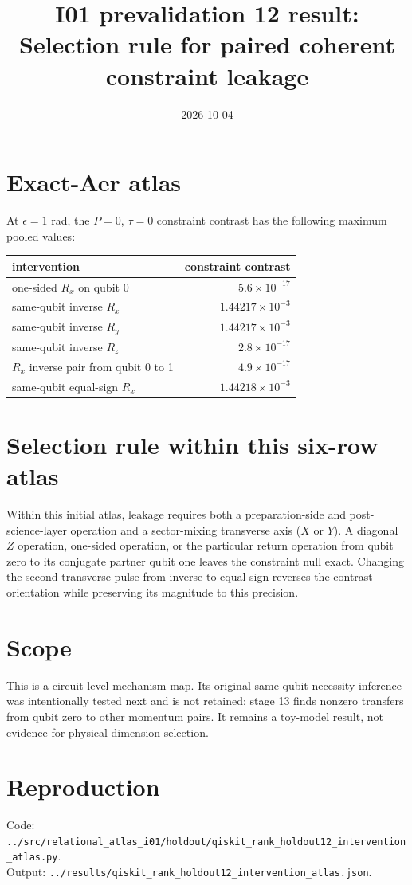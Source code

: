 \documentclass[11pt]{article}
\begin{document}
\title{I01 prevalidation 12 result:\\Selection rule for paired coherent constraint leakage}
\date{2026-10-04}
\maketitle

\section*{Exact-Aer atlas}
At $\epsilon=1$ rad, the $P=0$, $\tau=0$ constraint contrast has the following
maximum pooled values:
\begin{center}
\begin{tabular}{lr}
\toprule
intervention & constraint contrast\\
\midrule
one-sided $R_x$ on qubit 0 & $5.6\times10^{-17}$\\
same-qubit inverse $R_x$ & $1.44217\times10^{-3}$\\
same-qubit inverse $R_y$ & $1.44217\times10^{-3}$\\
same-qubit inverse $R_z$ & $2.8\times10^{-17}$\\
$R_x$ inverse pair from qubit 0 to 1 & $4.9\times10^{-17}$\\
same-qubit equal-sign $R_x$ & $1.44218\times10^{-3}$\\
\bottomrule
\end{tabular}
\end{center}

\section*{Selection rule within this six-row atlas}
Within this initial atlas, leakage requires both a preparation-side and
post-science-layer operation and a sector-mixing transverse axis ($X$ or $Y$).
A diagonal $Z$ operation, one-sided operation, or the particular return operation
from qubit zero to its conjugate partner qubit one leaves the constraint null exact.
Changing the second transverse pulse from inverse to equal sign reverses the
contrast orientation while preserving its magnitude to this precision.

\section*{Scope}
This is a circuit-level mechanism map. Its original same-qubit necessity inference
was intentionally tested next and is not retained: stage 13 finds nonzero transfers
from qubit zero to other momentum pairs. It remains a toy-model result, not evidence
for physical dimension selection.

\section*{Reproduction}
Code: \texttt{../src/relational\_atlas\_i01/holdout/qiskit\_rank\_holdout12\_intervention\_atlas.py}.\\
Output: \texttt{../results/qiskit\_rank\_holdout12\_intervention\_atlas.json}.
\end{document}
